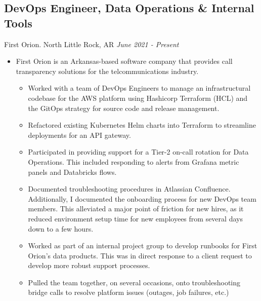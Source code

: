 \documentclass[11pt]{article}
\begin{document}
\subsection*{DevOps Engineer, Data Operations \& Internal Tools}
First Orion. North Little Rock, AR \hfill \textit{June 2021 - Present} \\
\begin{itemize}
	\item First Orion is an Arkansas-based software company that provides call transparency solutions for the telcommunications industry.
 \begin{itemize}
  \item Worked with a team of DevOps Engineers to manage an infrastructural codebase for the AWS platform using Hashicorp Terraform (HCL) and the GitOps strategy for source code and release management.
  \item Refactored existing Kubernetes Helm charts into Terraform to streamline deployments for an API gateway.
  \item Participated in providing support for a Tier-2 on-call rotation for Data Operations. This included responding to alerts from Grafana metric panels and Databricks flows.
  \item Documented troubleshooting procedures in Atlassian Confluence. Additionally, I documented the onboarding process for new DevOps team members. This alleviated a major point of friction for new hires, as it reduced environment setup time for new employees from several days down to a few hours.
  \item Worked as part of an internal project group to develop runbooks for First Orion's data products. This was in direct response to a client request to develop more robust support processes.
  \item Pulled the team together, on several occasions, onto troubleshooting bridge calls to resolve platform issues (outages, job failures, etc.)
 \end{itemize}
\end{itemize}
\\
\end{document}
